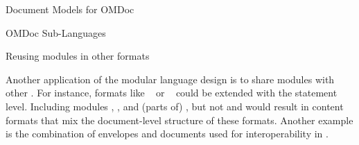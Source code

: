 \begin{module}[id=document-model]
\begin{omgroup}[id=document-model]{Document Models for OMDoc}
\begin{omgroup}[id=sub-languages]{OMDoc Sub-Languages}
\begin{omgroup}[id=spec-intro.reusing]{Reusing {\omdoc} modules in other formats}

Another application of the modular language design is to share modules with other {\xml}
. For instance, formats like
{\docbook}~\cite{WalMue:dtdg99} or {\xhtml}~\cite{W3C:xhtml2000} could be extended with
the {\omdoc} statement level.  Including modules {}, {},
and (parts of) {}, but not {} and {} would
result in content formats that mix the document-level structure of these formats.  Another
example is the combination of {\xmlrpc} envelopes and {\omdoc} documents used for
interoperability in {}.
\end{omgroup}
\end{omgroup}
\end{omgroup}
\end{module}



